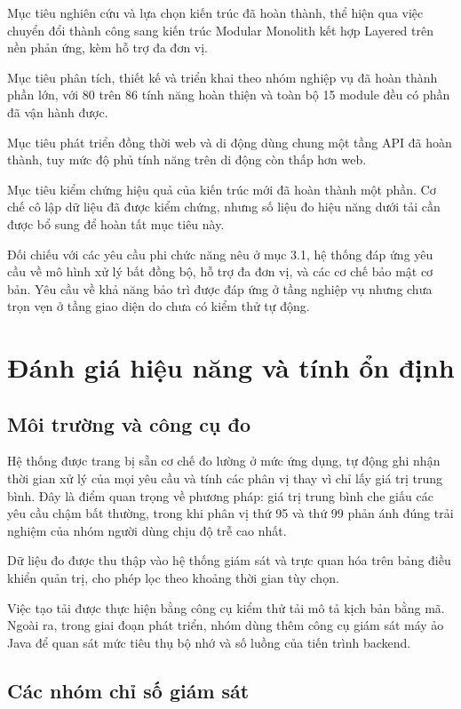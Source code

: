\documentclass[12pt,a4paper,oneside]{report}
\begin{document}
Mục tiêu nghiên cứu và lựa chọn kiến trúc đã hoàn thành, thể hiện qua việc chuyển đổi thành công sang kiến trúc Modular Monolith kết hợp Layered trên nền phản ứng, kèm hỗ trợ đa đơn vị.

Mục tiêu phân tích, thiết kế và triển khai theo nhóm nghiệp vụ đã hoàn thành phần lớn, với 80 trên 86 tính năng hoàn thiện và toàn bộ 15 module đều có phần đã vận hành được.

Mục tiêu phát triển đồng thời web và di động dùng chung một tầng API đã hoàn thành, tuy mức độ phủ tính năng trên di động còn thấp hơn web.

Mục tiêu kiểm chứng hiệu quả của kiến trúc mới đã hoàn thành một phần. Cơ chế cô lập dữ liệu đã được kiểm chứng, nhưng số liệu đo hiệu năng dưới tải cần được bổ sung để hoàn tất mục tiêu này.

Đối chiếu với các yêu cầu phi chức năng nêu ở mục 3.1, hệ thống đáp ứng yêu cầu về mô hình xử lý bất đồng bộ, hỗ trợ đa đơn vị, và các cơ chế bảo mật cơ bản. Yêu cầu về khả năng bảo trì được đáp ứng ở tầng nghiệp vụ nhưng chưa trọn vẹn ở tầng giao diện do chưa có kiểm thử tự động.

\section{Đánh giá hiệu năng và tính ổn định}

\subsection{Môi trường và công cụ đo}

Hệ thống được trang bị sẵn cơ chế đo lường ở mức ứng dụng, tự động ghi nhận thời gian xử lý của mọi yêu cầu và tính các phân vị thay vì chỉ lấy giá trị trung bình. Đây là điểm quan trọng về phương pháp: giá trị trung bình che giấu các yêu cầu chậm bất thường, trong khi phân vị thứ 95 và thứ 99 phản ánh đúng trải nghiệm của nhóm người dùng chịu độ trễ cao nhất.

Dữ liệu đo được thu thập vào hệ thống giám sát và trực quan hóa trên bảng điều khiển quản trị, cho phép lọc theo khoảng thời gian tùy chọn.

Việc tạo tải được thực hiện bằng công cụ kiểm thử tải mô tả kịch bản bằng mã. Ngoài ra, trong giai đoạn phát triển, nhóm dùng thêm công cụ giám sát máy ảo Java để quan sát mức tiêu thụ bộ nhớ và số luồng của tiến trình backend.

\subsection{Các nhóm chỉ số giám sát}
\end{document}
